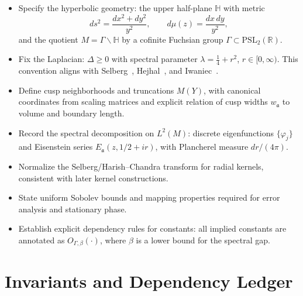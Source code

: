 \begin{itemize}[leftmargin=2em]
  \item[\textbf{(G1)}] Specify the hyperbolic geometry:
  the upper half-plane $\mathbb{H}$ with metric
  \[
    ds^2=\frac{dx^2+dy^2}{y^2}, \qquad
    d\mu(z)=\frac{dx\,dy}{y^2},
  \]
  and the quotient $M=\Gamma\backslash\mathbb{H}$ by a cofinite
  Fuchsian group $\Gamma\subset\mathrm{PSL}_2(\mathbb{R})$.

  \item[\textbf{(G2)}] Fix the Laplacian:
  $\Delta \ge 0$ with spectral parameter $\lambda=\tfrac14+r^2$,
  $r\in[0,\infty)$.
  This convention aligns with Selberg~\cite{Selberg1956},
  Hejhal~\cite{Hejhal1983}, and Iwaniec~\cite{Iwaniec2002}.

  \item[\textbf{(G3)}] Define cusp neighborhoods and truncations $M(Y)$,
  with canonical coordinates from scaling matrices
  and explicit relation of cusp widths $w_\mathfrak{a}$ to volume and boundary length.

  \item[\textbf{(G4)}] Record the spectral decomposition on $L^{2}(M)$:
  discrete eigenfunctions $\{\varphi_j\}$ and Eisenstein series
  $E_{\mathfrak{a}}(z,1/2+ir)$, with Plancherel measure $dr/(4\pi)$.

  \item[\textbf{(G5)}] Normalize the Selberg/Harish–Chandra transform
  for radial kernels, consistent with later kernel constructions.

  \item[\textbf{(G6)}] State uniform Sobolev bounds and mapping
  properties required for error analysis and stationary phase.

  \item[\textbf{(G7)}] Establish explicit dependency rules for constants:
  all implied constants are annotated as $O_{\Gamma,\beta}(\cdot)$,
  where $\beta$ is a lower bound for the spectral gap.
\end{itemize}

\section*{Invariants and Dependency Ledger}

